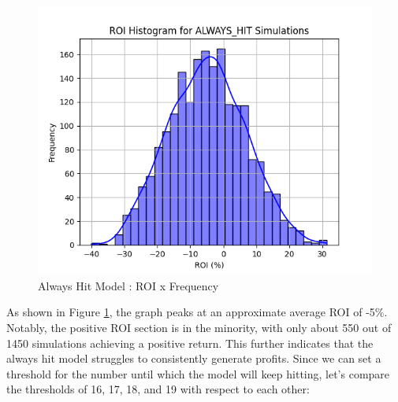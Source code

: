 \documentclass[a4paper,12pt]{report}
\begin{document}
\begin{figure}[h]
\begin{center}
\includegraphics[scale=0.45]{figures/graphs/ah_roi.png}
\end{center}
\caption{Always Hit Model : ROI x Frequency}
\label{fig:ah_roi}
\end{figure}

As shown in Figure \ref{fig:ah_roi}, the graph peaks at an approximate average ROI of -5\%. Notably, the positive ROI section is in the minority, with only about 550 out of 1450 simulations achieving a positive return. This further indicates that the always hit model struggles to consistently generate profits. Since we can set a threshold for the number until which the model will keep hitting, let's compare the thresholds of 16, 17, 18, and 19 with respect to each other:
\end{document}
